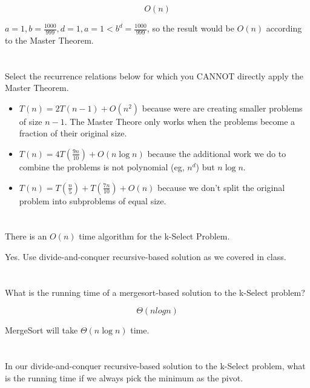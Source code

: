 \documentclass [12pt]{article}
\begin{document}
\begin{Solution}
$$O(n)$$

$a=1, b=\frac{1000}{999}, d=1, a=1 < b^d=\frac{1000}{999}$, so the result would be $O(n)$ according to the Master Theorem.
\end{Solution}


\section{} Select the recurrence relations below for which you CANNOT directly apply the Master Theorem.

\begin{Solution}
\begin{itemize}
  \item $T(n) = 2T(n-1) + O(n^2)$ because were are creating smaller problems of size $n - 1$. The Master Theore only works when the problems become a fraction of their original size.
  \item $T(n) = 4T\left(\frac{9n}{10}\right) + O(n \log n)$ because the additional work we do to combine the problems is not polynomial (eg, $n^d$) but $n \log n$.
  \item $T(n) = T\left(\frac{n}{5}\right) + T\left(\frac{7n}{10}\right) + O(n)$ because we don't split the original problem into subproblems of equal size.
\end{itemize}
\end{Solution}


\section{} There is an $O(n)$ time algorithm for the k-Select Problem.

\begin{Solution}
Yes. Use divide-and-conquer recursive-based solution as we covered in class.
\end{Solution}


\section{} What is the running time of a mergesort-based solution to the k-Select problem?

\begin{Solution}
$$\Theta(nlogn)$$

MergeSort will take $\Theta(n \log n)$ time.
\end{Solution}


\section{} In our divide-and-conquer recursive-based solution to the k-Select problem, what is the running time if we always pick the minimum as the pivot.
\end{document}
